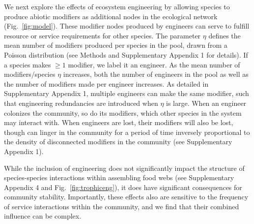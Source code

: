 \documentclass[twocolumn,preprintnumbers,amsmath,amssymb,superscriptaddress,linenumbers]{revtex4-1}
\begin{document}
We next explore the effects of ecosystem engineering by allowing species to produce abiotic modifiers as additional nodes in the ecological network (Fig.\ \ref{fig:model}).
These modifier nodes produced by engineers can serve to fulfill resource or service requirements for other species.
The parameter $\eta$ defines the mean number of modifiers produced per species in the pool, drawn from a Poisson distribution (see Methods and Supplementary Appendix 1 for details).
If a species makes $\geq 1$ modifier, we label it an engineer.
As the mean number of modifiers/species $\eta$ increases, both the number of engineers in the pool as well as the number of modifiers made per engineer increases.
As detailed in Supplementary Appendix 1, multiple engineers can make the same modifier, such that engineering redundancies are introduced when $\eta$ is large.
When an engineer colonizes the community, so do its modifiers, which other species in the system may interact with.
When engineers are lost, their modifiers will also be lost, though can linger in the community for a period of time inversely proportional to the density of disconnected modifiers in the community (see Supplementary Appendix 1).






While the inclusion of engineering does not significantly impact the structure of species-species interactions within assembling food webs (see Supplementary Appendix 4 and Fig.\ \ref{fig:trophiceng}), it does have significant consequences for community stability.
Importantly, these effects also are sensitive to the frequency of service interactions within the community, and we find that their combined influence can be complex.
\end{document}
